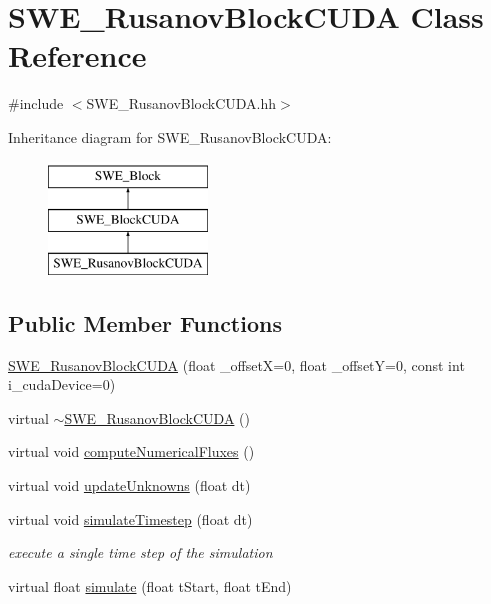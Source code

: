 \hypertarget{classSWE__RusanovBlockCUDA}{\section{S\-W\-E\-\_\-\-Rusanov\-Block\-C\-U\-D\-A Class Reference}
\label{classSWE__RusanovBlockCUDA}
}


{\ttfamily \#include $<$S\-W\-E\-\_\-\-Rusanov\-Block\-C\-U\-D\-A.\-hh$>$}

Inheritance diagram for S\-W\-E\-\_\-\-Rusanov\-Block\-C\-U\-D\-A\-:\begin{figure}[H]
\begin{center}
\leavevmode
\includegraphics[height=3.000000cm]{classSWE__RusanovBlockCUDA}
\end{center}
\end{figure}
\subsection*{Public Member Functions}
\begin{DoxyCompactItemize}
\item 
\hyperlink{classSWE__RusanovBlockCUDA_a5bd6db4a52d816534923d851ea6f9314}{S\-W\-E\-\_\-\-Rusanov\-Block\-C\-U\-D\-A} (float \-\_\-offset\-X=0, float \-\_\-offset\-Y=0, const int i\-\_\-cuda\-Device=0)
\item 
virtual \hyperlink{classSWE__RusanovBlockCUDA_a4af9183cc7715e1b1a3d91cdb98f9cda}{$\sim$\-S\-W\-E\-\_\-\-Rusanov\-Block\-C\-U\-D\-A} ()
\item 
virtual void \hyperlink{classSWE__RusanovBlockCUDA_a85ec49606ab69ded8cd6f39aa4be1505}{compute\-Numerical\-Fluxes} ()
\item 
virtual void \hyperlink{classSWE__RusanovBlockCUDA_a0a18726a733492218423eed37a7ab406}{update\-Unknowns} (float dt)
\item 
virtual void \hyperlink{classSWE__RusanovBlockCUDA_a238b383e0458babb52e3dd5b5784bc48}{simulate\-Timestep} (float dt)
\begin{DoxyCompactList}\small\item\em execute a single time step of the simulation \end{DoxyCompactList}\item 
virtual float \hyperlink{classSWE__RusanovBlockCUDA_a77719262dc1789adea136ed50f17bb58}{simulate} (float t\-Start, float t\-End)
\end{DoxyCompactItemize}

